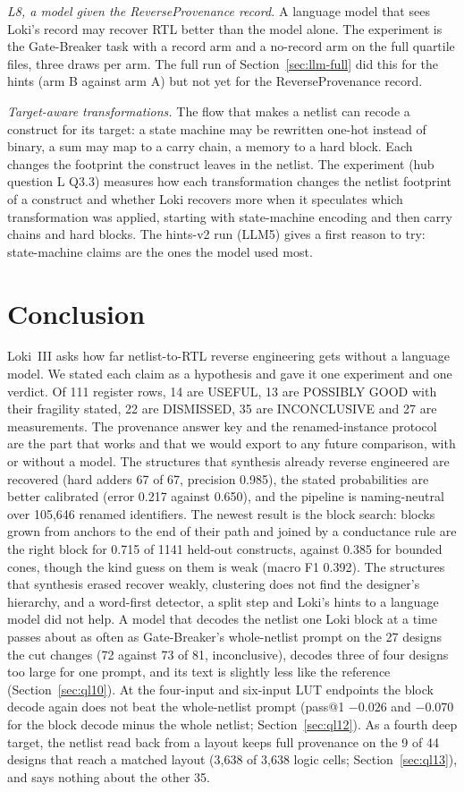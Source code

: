 \documentclass[conference]{IEEEtran}
\begin{document}
\emph{L8, a model given the ReverseProvenance record.} A language model that sees Loki's record may recover RTL
better than the model alone. The experiment is the Gate-Breaker task with a record arm and a no-record arm on the
full quartile files, three draws per arm. The full run of Section~\ref{sec:llm-full} did this for the hints (arm B against
arm A) but not yet for the ReverseProvenance record.

\emph{Target-aware transformations.} The flow that makes a netlist can recode a construct for its target: a state
machine may be rewritten one-hot instead of binary, a sum may map to a carry chain, a memory to a hard block. Each
changes the footprint the construct leaves in the netlist. The experiment (hub question L Q3.3) measures how each
transformation changes the netlist footprint of a construct and whether Loki recovers more when it speculates which
transformation was applied, starting with state-machine encoding and then carry chains and hard blocks. The hints-v2 run
(LLM5) gives a first reason to try: state-machine claims are the ones the model used most.

\section{Conclusion}
\label{sec:conclusion}

Loki~III asks how far netlist-to-RTL reverse engineering gets without a language model. We
stated each claim as a hypothesis and gave it one experiment and one verdict. Of 111 register rows,
14 are USEFUL, 13 are POSSIBLY GOOD with their fragility stated, 22 are DISMISSED, 35 are
INCONCLUSIVE and 27 are measurements. The provenance answer key and the renamed-instance protocol are
the part that works and that we would export to any future comparison, with or without a model. The
structures that synthesis already reverse engineered are recovered (hard adders 67 of 67, precision
0.985), the stated probabilities are better calibrated (error 0.217 against 0.650), and the pipeline is
naming-neutral over 105,646 renamed identifiers. The newest result is the block search: blocks grown
from anchors to the end of their path and joined by a conductance rule are the right block for 0.715
of 1141 held-out constructs, against 0.385 for bounded cones, though the kind guess on them is weak
(macro F1 0.392). The structures that synthesis erased recover weakly, clustering does not find the
designer's hierarchy, and a word-first detector, a split step and Loki's hints to a language model
did not help. A model that decodes the netlist one Loki block at a time passes about as often as
Gate-Breaker's whole-netlist prompt on the 27 designs the cut changes (72 against 73 of 81, inconclusive), decodes three of
four designs too large for one prompt, and its text is slightly less like the reference (Section~\ref{sec:ql10}).
At the four-input and six-input LUT endpoints the block decode again does not beat the whole-netlist prompt (pass@1 $-0.026$ and $-0.070$ for the block decode minus the whole netlist; Section~\ref{sec:ql12}). As a fourth deep target, the netlist read back from a layout keeps full provenance on the 9 of 44 designs that reach a matched layout (3,638 of 3,638 logic cells; Section~\ref{sec:ql13}), and says nothing about the other 35.
\end{document}
